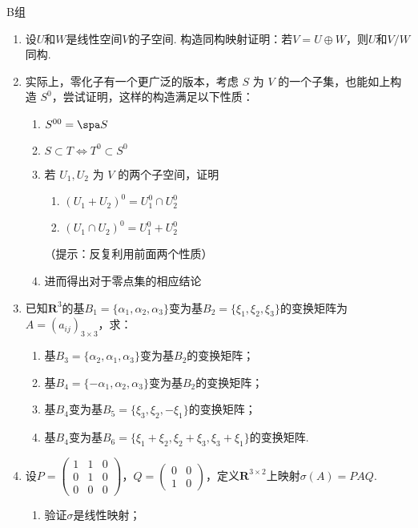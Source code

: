 \centerline{\heiti B组}
\begin{enumerate}
    \item 设$U$和$W$是线性空间$V$的子空间. 构造同构映射证明：若$V=U\oplus W$，则$U$和$V/W$同构.
    \item 实际上，零化子有一个更广泛的版本，考虑 $S$ 为 $V$ 的一个子集，也能如上构造 $S^0$，尝试证明，这样的构造满足以下性质：
          \begin{enumerate}
              \item $S^{00} = \spa S$
              \item $S \subset T \iff T^0 \subset S^0$
              \item 若 $U_1, U_2$ 为 $V$ 的两个子空间，证明 \begin{enumerate}
                        \item $(U_1 + U_2)^0 = U_1^0 \cap U_2^0$
                        \item $(U_1 \cap U_2)^0 = U_1^0 + U_2^0$
                    \end{enumerate}（提示：反复利用前面两个性质）
              \item 进而得出对于零点集的相应结论
          \end{enumerate}
    \item 已知$\mathbf{R}^3$的基$B_1=\{\alpha_1,\alpha_2,\alpha_3\}$变为基$B_2=\{\xi_1,\xi_2,\xi_3\}$的变换矩阵为$A=(a_{ij})_{3 \times 3}$，求：
          \begin{enumerate}
              \item 基$B_3=\{\alpha_2,\alpha_1,\alpha_3\}$变为基$B_2$的变换矩阵；

              \item 基$B_4=\{-\alpha_1,\alpha_2,\alpha_3\}$变为基$B_2$的变换矩阵；

              \item 基$B_4$变为基$B_5=\{\xi_3,\xi_2,-\xi_1\}$的变换矩阵；

              \item 基$B_4$变为基$B_6=\{\xi_1+\xi_2,\xi_2+\xi_3,\xi_3+\xi_1\}$的变换矩阵.
          \end{enumerate}

    \item 设$P=\begin{pmatrix}
                  1 & 1 & 0 \\ 0 & 1 & 0 \\ 0 & 0 & 0
              \end{pmatrix}$，$Q=\begin{pmatrix}
                  0 & 0 \\ 1 & 0
              \end{pmatrix}$，定义$\mathbf{R}^{3\times 2}$上映射$\sigma(A)=PAQ$.
          \begin{enumerate}
              \item 验证$\sigma$是线性映射；


\end{enumerate}
\end{enumerate}
